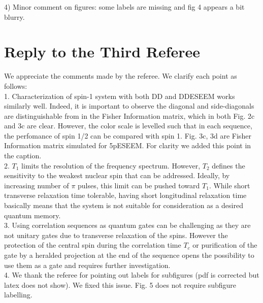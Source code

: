 \documentclass[12pt]{amsart}
\begin{document}
	4) Minor comment on figures: some labels are missing and fig 4 appears
	a bit blurry.
	
	\color{black} \section*{ Reply to the Third Referee}
	We appreciate the comments made by the referee. We clarify each point as follows:\\
	
	1. Characterization of spin-1 system with both DD and DDESEEM works similarly well. Indeed, it is important to observe the diagonal and side-diagonals are distinguishable from in the Fisher Information matrix, which in both Fig. 2c and 3c are clear. However, the color scale is levelled such that in each sequence, the perfomance of spin 1/2 can be compared with spin 1. Fig. 3c, 3d are Fisher Information matrix simulated for 5pESEEM. For clarity we added this point in the caption.\\
	
	2. $T_1$ limits the resolution of the frequency spectrum. However, $T_2$ defines the sensitivity to the weakest nuclear spin that can be addressed. Ideally, by increasing number of $\pi$ pulses, this limit can be pushed toward $T_1$. While short transverse relaxation time tolerable, having short longitudinal relaxation time basically means that the system is not suitable for consideration as a desired quantum memory. \\
	
	3. Using correlation sequences as quantum gates can be challenging as they are not unitary gates due to transverse relaxation of the spins. However the protection of the central spin during the correlation time $T_c$ or purification of the gate by a heralded projection at the end of the sequence opens the possibility to use them as a gate and requires further investigation.\\
	
	4. We thank the referee for pointing out labels for subfigures (pdf is corrected but latex does not show). We fixed this issue. Fig. 5 does not require subfigure labelling.
\end{document}
